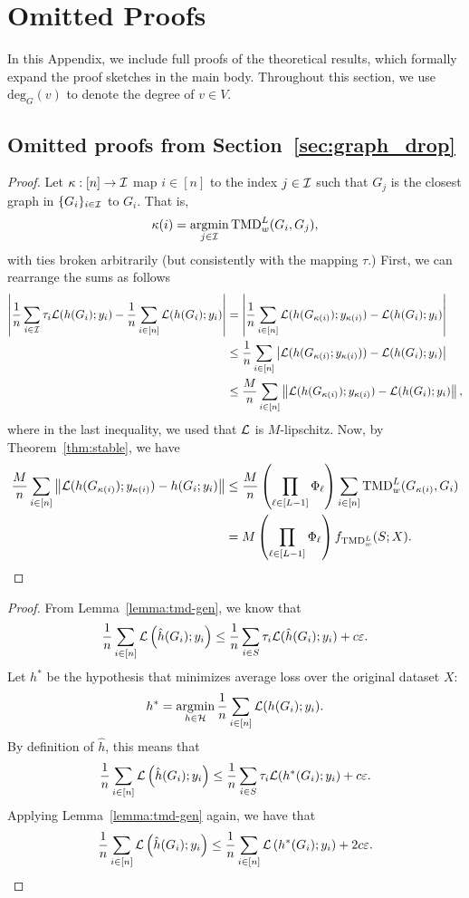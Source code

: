 \FloatBarrier
\newpage
\section{Omitted Proofs}\label{sec:apx}


In this Appendix, we include full proofs of the theoretical results, which formally expand the proof sketches in the main body. Throughout this section, we use $\text{deg}_G(v)$ to denote the degree of $v \in V$. 

\subsection{Omitted proofs from Section~\ref{sec:graph_drop}}\label{sec:apx_graph_drop}

\tmdgen*
\begin{proof} Let $\kappa: [n] \to \mathcal I$ map $i \in [n]$ to the index $j \in \mathcal I$ such that $G_j$ is the closest graph in $\{G_i\}_{i \in \mathcal I}$ to $G_i.$ That is, 
\begin{align*}
    \kappa(i) = \operatorname*{argmin}_{j \in \mathcal I} \textnormal{TMD}_w^L(G_i, G_j), 
\end{align*}
with ties broken arbitrarily (but consistently with the mapping $\tau$.) First, we can rearrange the sums as follows
\begin{align*}
    \left\lvert\frac{1}{n} \sum_{i \in \mathcal I} \tau_i \mathcal L(h(G_i); y_i) - \frac{1}{n}\sum_{i \in [n]}\mathcal L(h(G_i); y_i)\right\rvert &= \left\lvert \frac{1}{n}\sum_{i \in [n]} \mathcal L(h(G_{\kappa(i)}); y_{\kappa(i)})- \mathcal L(h(G_i); y_i)\right\rvert \\
    &\leq  \frac{1}{n}\sum_{i \in [n]} \left\lvert\mathcal L(h(G_{\kappa(i)}; y_{\kappa(i)}))- \mathcal L(h(G_i); y_i)\right\rvert \\
    &\leq  \frac{M}{n}\sum_{i \in [n]} \left\lVert\mathcal L(h(G_{\kappa(i)}); y_{\kappa(i)})- \mathcal L(h(G_i); y_i)\right\rVert,
\end{align*}
where in the last inequality, we used that $\mathcal L$ is $M$-lipschitz. Now, by Theorem~\ref{thm:stable}, we have 
\begin{align*}
    \frac{M}{n}\sum_{i \in [n]} \left\lVert\mathcal L(h(G_{\kappa(i)}); y_{\kappa(i)})- h(G_i; y_i)\right\rVert &\leq \frac{M}{n} \left(\prod_{\ell \in [L-1]} \Phi_\ell \right ) \sum_{i \in [n]} \textnormal{TMD}_w^L(G_{\kappa(i)}, G_i) \\
    &= M \left(\prod_{\ell \in [L-1]} \Phi_\ell \right ) f_{\textnormal{TMD}_w^L}(S; X).
\end{align*}
\end{proof}

\erm*
\begin{proof}
From Lemma~\ref{lemma:tmd-gen}, we know that \[\frac{1}{n}\sum_{i \in [n]}\mathcal L\left(\hat{h}(G_i); y_i \right ) \leq \frac{1}{n} \sum_{i \in S} \tau_{i} \mathcal L(\hat{h}(G_i); y_i) + c\varepsilon.\]
    Let $h^*$ be the hypothesis that minimizes average loss over the original dataset $X$: \[h^* = \operatorname*{argmin}_{h \in \mathcal H}\frac{1}{n}\sum_{i \in [n]}\mathcal L(h(G_i); y_i).\] By definition of $\hat{h}$, this means that \[\frac{1}{n}\sum_{i \in [n]}\mathcal L\left(\hat{h}(G_i); y_i \right ) \leq \frac{1}{n} \sum_{i \in S} \tau_{i} \mathcal L(h^*(G_i); y_i) + c\varepsilon.\] Applying Lemma~\ref{lemma:tmd-gen} again, we have that  \[\frac{1}{n}\sum_{i \in [n]}\mathcal L\left(\hat{h}(G_i); y_i \right ) \leq \frac{1}{n}\sum_{i \in [n]}\mathcal L\left(h^*(G_i); y_i \right ) + 2c\varepsilon.\]
\end{proof}

